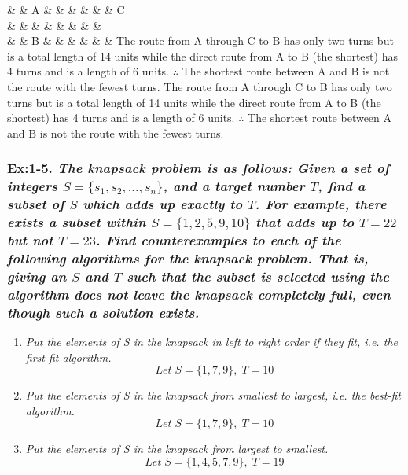 \begin{solcen}
	{\&  \arrow[d, "1"] \& A \arrow[rrrrrr, "6"] \arrow[l, "1"] \&  \&  \&  \&  \&  \& C \arrow[dd, "2"] \\
	\arrow[d, "1"] \&  \arrow[l, "1"] \&  \&  \&  \&  \&  \&  \&  \\
	\arrow[rr, "2"] \&  \& B \&  \&  \&  \&  \&  \&  \arrow[llllll, "6"]}
%
	{The route from A through C to B has only two turns but is a total length of 14 units while the direct route from A to B (the shortest) has 4 turns and is a length of 6 units. $\therefore$ The shortest route between A and B is not the route with the fewest turns.
	The route from A through C to B has only two turns but is a total length of 14 units while 
	the direct route from A to B (the shortest) has 4 turns and is a length of 6 units. 
	$\therefore$ The shortest route between A and B is not the route with the fewest turns.}
\end{solcen}



\subsubsection*{\textbf{\enspace Ex:1-5.} \emph{\textbf{The knapsack problem is as follows:}} \emph{Given a set of integers $S = \{s_{1}, s_{2},...,s_{n}\}$,
and a target number $T$, find a subset of $S$ which adds up exactly to $T$. For example,
there exists a subset within $S = \{1, 2, 5, 9, 10\}$ that adds up to $T = 22$ but not
$T = 23$.
Find counterexamples to each of the following algorithms for the knapsack problem.
That is, giving an $S$ and $T$ such that the subset is selected using the algorithm does
not leave the knapsack completely full, even though such a solution exists.}}

\begin{enumerate}[label=(\alph*)]
\itemsep1pt\parskip0pt
	\item{\emph{Put the elements of S in the knapsack in left to right order if they fit, i.e. the first-fit algorithm.} \\
		\textcolor{answer}{
		 $$Let\;  S = \{1,7,9\}, \; T = 10$$
		}
	}
	\item{\emph{Put the elements of S in the knapsack from smallest to largest, i.e. the best-fit algorithm.} \\
		\textcolor{answer}{
		$$Let\;  S = \{1,7,9\}, \; T = 10$$
		}
	}
	\item{\emph{Put the elements of S in the knapsack from largest to smallest.} \\
		\textcolor{answer}{
		$$Let\;  S = \{1,4,5,7,9\}, \; T = 19$$
		}
	}
\end{enumerate}

